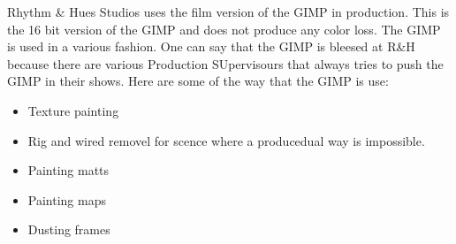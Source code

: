 Rhythm \& Hues Studios uses the film version of the GIMP in production. This is the 16 bit version of the GIMP and does not produce any color loss. The GIMP is used in a various fashion. One can say that the GIMP is bleesed at R\&H because there are various Production SUpervisours that always tries to push the GIMP in their shows. Here are some of the way that the GIMP is use:
\begin{itemize}
\item Texture painting 
\item Rig and wired removel for scence where a producedual way is impossible.
\item Painting matts
\item Painting maps
\item Dusting frames
\end{itemize}


